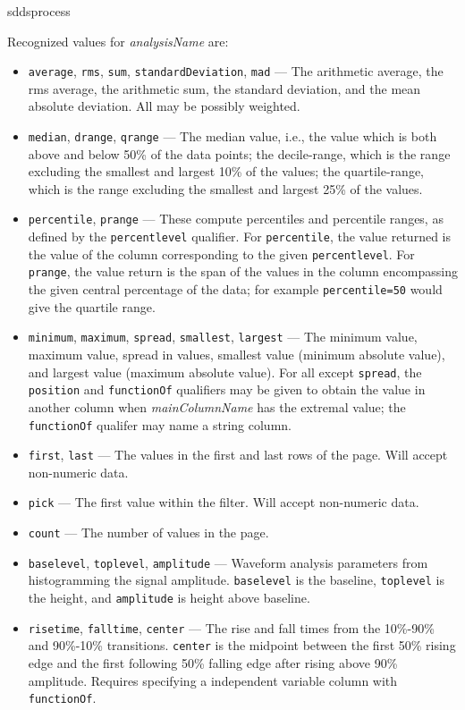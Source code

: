 \begin{sddsprog}{sddsprocess}
\begin{itemize}
\begin{itemize}
Recognized values for {\em analysisName} are:
\begin{itemize}
\item {\tt average}, {\tt rms}, {\tt sum}, {\tt standardDeviation}, {\tt mad} --- The arithmetic average, 
the rms average, the arithmetic sum, the standard deviation, and the mean absolute deviation.  All may be possibly
weighted.
\item {\tt median}, {\tt drange}, {\tt qrange} --- The median value, i.e., the value which is both above and below
50\% of the data points; the decile-range, which is the range excluding the smallest and largest 10\% of the values;
the quartile-range, which is the range excluding the smallest and largest 25\% of the values.
\item {\tt percentile}, {\tt prange} --- These compute percentiles and percentile ranges, as defined by the 
  {\tt percentlevel} qualifier.  For {\tt percentile}, the value returned is the value of the column corresponding
  to the given {\tt percentlevel}.  For {\tt prange}, the value return is the span of the values in the column
  encompassing the given central percentage of the data; for example {\tt percentile=50} would give the quartile range.

\item {\tt minimum}, {\tt maximum}, {\tt spread}, {\tt smallest}, {\tt largest} --- 
The minimum value, maximum value, spread in values, smallest value (minimum absolute value), and largest value
(maximum absolute value).  For all except {\tt spread}, the {\tt position} and {\tt functionOf} qualifiers may be
given to obtain the value in another column when {\em mainColumnName} has the extremal value; the {\tt functionOf} qualifer may name a string column.

\item {\tt first}, {\tt last} --- The values in the first and last rows of the page.  Will accept non-numeric
data.
\item {\tt pick} --- The first value within the filter.  Will accept non-numeric data.
\item {\tt count} ---  The number of values in the page.
\item {\tt baselevel}, {\tt toplevel}, {\tt amplitude} --- Waveform analysis parameters from histogramming
the signal amplitude.  {\tt baselevel} is the baseline, {\tt toplevel} is the height, and {\tt amplitude}
is height above baseline.

\item {\tt risetime}, {\tt falltime}, {\tt center} --- The rise and fall times from the 10\%-90\% and
90\%-10\% transitions.  {\tt center} is the midpoint between the first 50\% rising edge and the first following 50\%
falling edge after rising above 90\% amplitude.  Requires specifying a independent variable column with {\tt
functionOf}.


\end{itemize}
\end{itemize}
\end{itemize}
\end{sddsprog}
